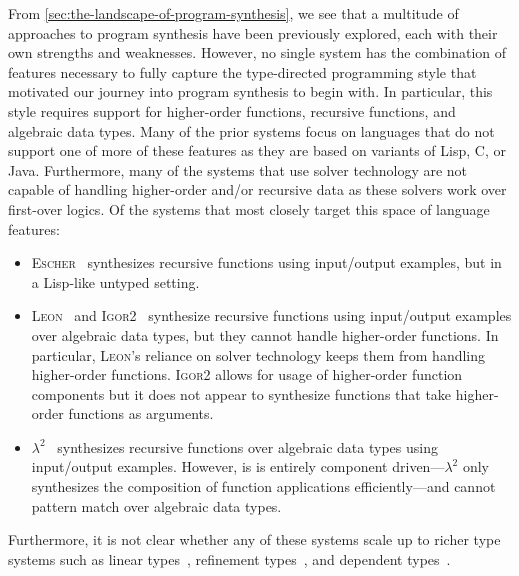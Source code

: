 From \autoref{sec:the-landscape-of-program-synthesis}, we see that a multitude of approaches to program synthesis have been previously explored, each with their own strengths and weaknesses.
However, no single system has the combination of features necessary to fully capture the type-directed programming style that motivated our journey into program synthesis to begin with.
In particular, this style requires support for higher-order functions, recursive functions, and algebraic data types.
Many of the prior systems focus on languages that do not support one of more of these features as they are based on variants of Lisp, C, or Java.
Furthermore, many of the systems that use solver technology are not capable of handling higher-order and/or recursive data as these solvers work over first-over logics.
Of the systems that most closely target this space of language features:
\begin{itemize}
  \item \textsc{Escher}~\citep{albarghouthi-cav-2013} synthesizes recursive functions using input/output examples, but in a Lisp-like untyped setting.
  \item \textsc{Leon}~\citep{kuncak-pldi-2010} and \textsc{Igor2}~\citep{hofmann-aaip-2010} synthesize recursive functions using input/output examples over algebraic data types, but they cannot handle higher-order functions.
    In particular, \textsc{Leon}'s reliance on solver technology keeps them from handling higher-order functions.
    \textsc{Igor2} allows for usage of higher-order function components but it does not appear to synthesize functions that take higher-order functions as arguments.
  \item $λ^2$~\citep{feser-pldi-2015} synthesizes recursive functions over algebraic data types using input/output examples.
    However, is is entirely component driven---$λ^2$ only synthesizes the composition of function applications efficiently---and cannot pattern match over algebraic data types.
\end{itemize}
Furthermore, it is not clear whether any of these systems scale up to richer type systems such as linear types~\citep{girard-1987}, refinement types~\citep{freeman-pldi-1991}, and dependent types~\citep{martin-lof-1984}.

